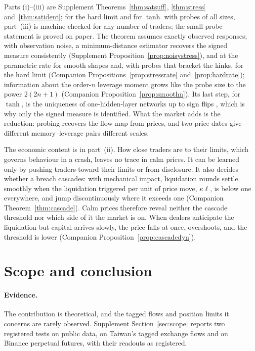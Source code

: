 \documentclass[12pt]{article}
\theoremstyle{definition}
\theoremstyle{remark}
\begin{document}
Parts (i)--(iii) are Supplement Theorems~\ref{thm:satsuff}, \ref{thm:stress} and~\ref{thm:satident}; for the hard limit and for $\tanh$ with probes of all sizes, part~(iii) is machine-checked for any number of traders; the small-probe statement is proved on paper. The theorem assumes exactly observed responses; with observation noise, a minimum-distance estimator recovers the signed measure consistently (Supplement Proposition~\ref{prop:noisystress}), and at the parametric rate for smooth shapes and, with probes that bracket the kinks, for the hard limit (Companion Propositions~\ref{prop:stressrate} and~\ref{prop:hardrate}); information about the order-$n$ leverage moment grows like the probe size to the power $2(2n+1)$ (Companion Proposition~\ref{prop:smoothn}). Its last step, for $\tanh$, is the uniqueness of one-hidden-layer networks up to sign flips \citep{sussmann1992}, which is why only the signed measure is identified. What the market adds is the reduction: probing recovers the flow map from prices, and two price dates give different memory--leverage pairs different scales.

The economic content is in part~(ii). How close traders are to their limits, which governs behaviour in a crash, leaves no trace in calm prices. It can be learned only by pushing traders toward their limits or from disclosure. It also decides whether a breach cascades: with mechanical impact, liquidation rounds settle smoothly when the liquidation triggered per unit of price move, $\kappa\ell$, is below one everywhere, and jump discontinuously where it exceeds one (Companion Theorem~\ref{thm:cascade}). Calm prices therefore reveal neither the cascade threshold nor which side of it the market is on. When dealers anticipate the liquidation but capital arrives slowly, the price falls at once, overshoots, and the threshold is lower (Companion Proposition~\ref{prop:cascadedyn}).

\section{Scope and conclusion}\label{n:concl}

\paragraph{Evidence.} The contribution is theoretical, and the tagged flows and position limits it concerns are rarely observed. Supplement Section~\ref{sec:scope} reports two registered tests on public data, on Taiwan's tagged exchange flows and on Binance perpetual futures, with their readouts as registered.
\end{document}

